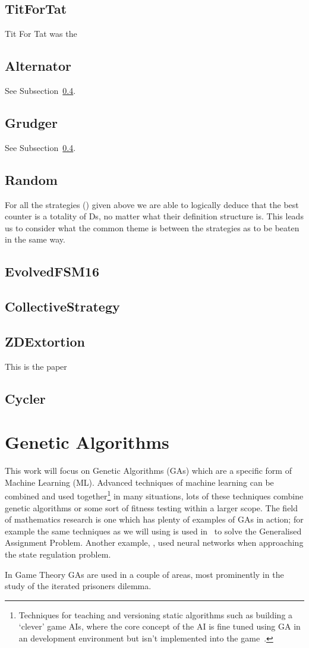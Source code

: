 \subsection{TitForTat}\label{subsec:titfortat}
Tit For Tat was the
\subsection{Alternator}\label{subsec:alternator}
See Subsection~\ref{subsec:random}.
\subsection{Grudger}\label{subsec:grudger}
See Subsection~\ref{subsec:random}.
\subsection{Random}\label{subsec:random}

For all the strategies () given above we are able to logically deduce that the best counter is a totality of Ds, no matter what their definition structure is.
This leads us to consider what the common theme is between the strategies as to be beaten in the same way.

\subsection{EvolvedFSM16}\label{subsec:evolvedFSM16}
\subsection{CollectiveStrategy}\label{subsec:collectiveStrategy}
\subsection{ZDExtortion}\label{subsec:zdExtortion}
This is the paper~\cite{press2012iterated}
\subsection{Cycler}\label{subsec:cycler}

\section{Genetic Algorithms}
This work will focus on Genetic Algorithms (GAs) which are a specific form of Machine Learning (ML).
Advanced techniques of machine learning can be combined and used together\footnote{Techniques for teaching and versioning static algorithms such as building a `clever' game AIs, where the core concept of the AI is fine tuned using GA in an development environment but isn't implemented into the game~\cite{bakkes2009rapid}.} in many situations, lots of these techniques combine genetic algorithms or some sort of fitness testing within a larger scope.
The field of mathematics research is one which has plenty of examples of GAs in action;
for example the same techniques as we will using is used in~\cite{chu1997genetic} to solve the Generalised Assignment Problem.
Another example, \cite{bhanu1995adaptive}, used neural networks when approaching the state regulation problem.

In Game Theory GAs are used in a couple of areas, most prominently in the study of the iterated prisoners dilemma.